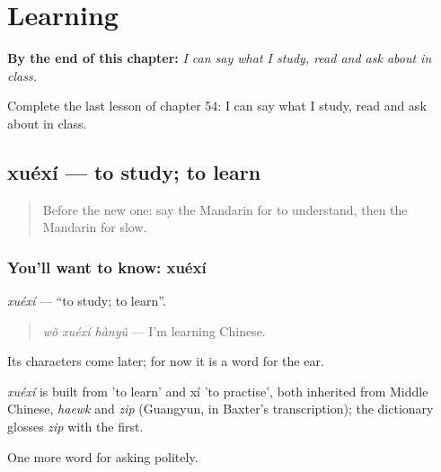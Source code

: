 
\chapter{Learning}
\label{ch:zh-learning}

\begin{chapteropening}
\textbf{By the end of this chapter:} \emph{I can say what I study, read and ask about in class.}

Complete the last lesson of chapter 54: I can say what I study, read and ask about in class.
\end{chapteropening}

\section[xuéxí]{xuéxí — to study; to learn}

\label{lesson:ZH-C54-xuexi}



\begin{quote}
Before the new one: say the Mandarin for to understand, then the Mandarin for slow.
\end{quote}

\subsection*{You'll want to know: xuéxí}
\emph{xuéxí} — \textquotedblleft{}to study; to learn\textquotedblright{}.

\begin{quote}
\emph{wǒ xuéxí hànyǔ} — I'm learning Chinese.
\end{quote}

Its characters come later; for now it is a word for the ear.

\begin{cousinweb}
\emph{xuéxí} is built from  'to learn' and xí 'to practise', both inherited from Middle Chinese, \emph{haewk} and \emph{zip} (Guangyun, in Baxter's transcription); the dictionary glosses \emph{zip} with the first.
\end{cousinweb}

\begin{grammarlens}[title={What you've built}]
One more word for asking politely.
\end{grammarlens}

